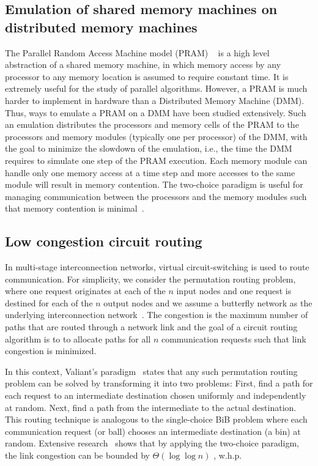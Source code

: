\documentclass[a4paper,12pt]{article}
\begin{document}
\subsection{Emulation of shared memory machines on distributed memory machines}
\label{sec:DMM}
The Parallel Random Access Machine model (PRAM) ~\cite{P03} is a high level abstraction of a shared memory machine, in which memory access by any processor to any memory location is assumed to require constant time. It is extremely useful for the study of parallel algorithms. However, a PRAM is much harder to implement in hardware than a Distributed Memory Machine (DMM). Thus, ways to emulate a PRAM on a DMM have been studied extensively. Such an emulation distributes the processors and memory cells of the PRAM to the processors and memory modules (typically one per processor) of the DMM, with the goal to minimize the slowdown of the emulation, i.e., the time the DMM requires to simulate one step of the PRAM execution. Each memory module can handle only one memory access at a time step and more accesses to the same module will result in memory contention. The two-choice paradigm is useful for managing communication between the processors and the memory modules such that memory contention is minimal~\cite{KLM92}.
 
\subsection{Low congestion circuit routing}
\label{sec:circuitrouting}
In multi-stage interconnection networks, virtual circuit-switching is used to route communication. For simplicity, we consider the permutation routing problem, where one request originates at each of the $n$ input nodes and one request is destined for each of the $n$ output nodes and we assume a butterfly network as the underlying interconnection network~\cite{CLR09}. The congestion is the maximum number of paths that are routed through a network link and the goal of a circuit routing algorithm is to to allocate paths for all $n$ communication requests such that link congestion is minimized.

In this context, Valiant's paradigm~\cite{V82} states that any such permutation routing problem can be solved by transforming it into two problems: First, find a path for each request to an intermediate destination chosen uniformly and independently at random. Next, find a path from the intermediate to the actual destination. This routing technique is analogous to the single-choice BiB problem where each communication request (or ball) chooses an intermediate destination (a bin) at random.
Extensive research~\cite{CMM+98,MRS01} shows that by applying the two-choice paradigm, the link congestion can be bounded by $\Theta\left(\log \log n\right)$ , w.h.p.
\end{document}
